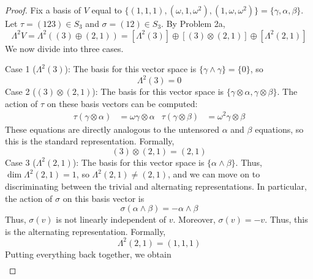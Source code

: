\documentclass[../psets.tex]{subfiles}
\begin{document}
\begin{enumerate}
\begin{enumerate}
        \begin{proof}
            Fix a basis of $V$ equal to $\{(1,1,1),(\omega,1,\omega^2),(1,\omega,\omega^2)\}=\{\gamma,\alpha,\beta\}$. Let $\tau=(123)\in S_3$ and $\sigma=(12)\in S_3$. By Problem 2a,
            \begin{equation*}
                \Lambda^2V = \Lambda^2((3)\oplus(2,1))
                = [\Lambda^2(3)]\oplus[(3)\otimes(2,1)]\oplus[\Lambda^2(2,1)]
            \end{equation*}
            We now divide into three cases.\par\smallskip
            Case 1 ($\Lambda^2(3)$): The basis for this vector space is $\{\gamma\wedge\gamma\}=\{0\}$, so
            \begin{equation*}
                \Lambda^2(3) = 0
            \end{equation*}
            Case 2 ($(3)\otimes(2,1)$): The basis for this vector space is $\{\gamma\otimes\alpha,\gamma\otimes\beta\}$. The action of $\tau$ on these basis vectors can be computed:
            \begin{align*}
                \tau(\gamma\otimes\alpha) &= \omega\gamma\otimes\alpha&
                \tau(\gamma\otimes\beta) &= \omega^2\gamma\otimes\beta
            \end{align*}
            These equations are directly analogous to the untensored $\alpha$ and $\beta$ equations, so this is the standard representation. Formally,
            \begin{equation*}
                (3)\otimes(2,1) = (2,1)
            \end{equation*}
            Case 3 ($\Lambda^2(2,1)$): The basis for this vector space is $\{\alpha\wedge\beta\}$. Thus, $\dim\Lambda^2(2,1)=1$, so $\Lambda^2(2,1)\neq(2,1)$, and we can move on to discriminating between the trivial and alternating representations. In particular, the action of $\sigma$ on this basis vector is
            \begin{equation*}
                \sigma(\alpha\wedge\beta) = -\alpha\wedge\beta
            \end{equation*}
            Thus, $\sigma(v)$ is not linearly independent of $v$. Moreover, $\sigma(v)=-v$. Thus, this is the alternating representation. Formally,
            \begin{equation*}
                \Lambda^2(2,1) = (1,1,1)
            \end{equation*}
            Putting everything back together, we obtain
            \begin{align*}

\end{align*}
\end{proof}
\end{enumerate}
\end{enumerate}
\end{document}
